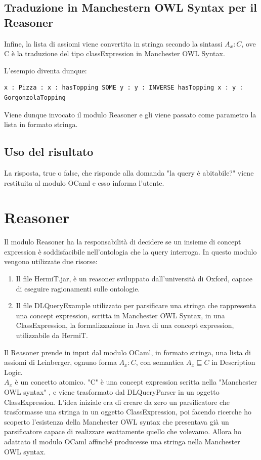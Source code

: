 \subsection{Traduzione in Manchestern OWL Syntax per il Reasoner}
Infine, la lista di assiomi viene convertita in stringa secondo la sintassi \(A_{x} : C\), ove C è la traduzione del tipo classExpression in Manchester OWL Syntax.

L'esempio diventa dunque:
\begin{verbatim}
x : Pizza : x : hasTopping SOME y : y : INVERSE hasTopping x : y : GorgonzolaTopping
\end{verbatim}
Viene dunque invocato il modulo Reasoner e gli viene passato come parametro la lista in formato stringa.

\subsection{Uso del risultato}
La risposta, true o false, che risponde alla domanda "la query è abitabile?" viene restituita al modulo OCaml e esso informa l'utente.

\newpage
\section{Reasoner}
Il modulo Reasoner ha la responsabilità di decidere se un insieme di concept expression è soddisfacibile nell'ontologia che la query interroga. In questo modulo vengono utilizzate due risorse:
\begin{enumerate}
    \item Il file HermiT.jar\cite{HermiT}, è un reasoner sviluppato dall'università di Oxford, capace di eseguire ragionamenti sulle ontologie.
    \item Il file DLQueryExample\cite{DLQueryExample} utilizzato per parsificare una stringa che rappresenta una concept expression, scritta in Manchester OWL Syntax, in una ClassExpression, la formalizzazione in Java di una concept expression, utilizzabile da HermiT.
\end{enumerate}

Il Reasoner prende in input dal modulo OCaml, in formato stringa, una lista di assiomi di Leinberger, ognuno forma \(A_{x} : C\), con semantica \( A_{x}\sqsubseteq C \) in Description Logic.
\\\(A_{x}\) è un concetto atomico. "C" è una concept expression scritta nella "Manchester OWL syntax" \cite{ManchesterOWLSyntax}, e viene trasformato dal DLQueryParser in un oggetto ClassExpression. L'idea iniziale era di creare da zero un parsificatore che trasformasse una stringa in un oggetto ClassExpression, poi facendo ricerche ho scoperto l'esistenza della Manchester OWL syntax che presentava già un parsificatore capace di realizzare esattamente quello che volevamo. Allora ho adattato il modulo OCaml affinché producesse una stringa nella Manchester OWL syntax.

